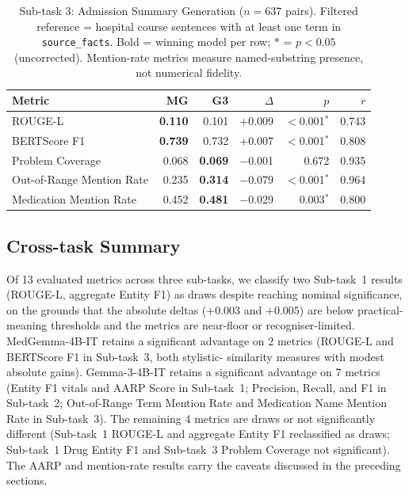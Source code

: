 \documentclass[sigconf,anonymous=false,review=false]{acmart}
\newcommand{\medgemma}{MedGemma-4B-IT\xspace}
\newcommand{\gemma}{Gemma-3-4B-IT\xspace}
\begin{document}
\begin{table}[t]
\caption{Sub-task 3: Admission Summary Generation ($n = 637$ pairs). Filtered
reference = hospital course sentences with at least one term in
\texttt{source\_facts}. Bold = winning model per row; $*$ = $p < 0.05$
(uncorrected). Mention-rate metrics measure named-substring presence, not
numerical fidelity.}
\label{tab:summary}
\small
\begin{tabular}{@{}lrrrrr@{}}
\toprule
\textbf{Metric} & \textbf{MG} & \textbf{G3} & \textbf{$\Delta$} &
  \textbf{$p$} & \textbf{$r$} \\
\midrule
ROUGE-L                       & \textbf{0.110} & 0.101 & $+$0.009 & $<$0.001$^*$ & 0.743 \\
BERTScore F1                  & \textbf{0.739} & 0.732 & $+$0.007 & $<$0.001$^*$ & 0.808 \\
Problem Coverage              & 0.068 & \textbf{0.069} & $-$0.001 & 0.672 & 0.935 \\
Out-of-Range Mention Rate     & 0.235 & \textbf{0.314} & $-$0.079 & $<$0.001$^*$ & 0.964 \\
Medication Mention Rate       & 0.452 & \textbf{0.481} & $-$0.029 & 0.003$^*$ & 0.800 \\
\bottomrule
\end{tabular}
\end{table}

\subsection{Cross-task Summary}

Of 13 evaluated metrics across three sub-tasks, we classify two Sub-task~1
results (ROUGE-L, aggregate Entity F1) as draws despite reaching nominal
significance, on the grounds that the absolute deltas (\(+0.003\) and
\(+0.005\)) are below practical-meaning thresholds and the metrics are
near-floor or recogniser-limited. \medgemma retains a significant advantage
on 2 metrics (ROUGE-L and BERTScore F1 in Sub-task~3, both stylistic-
similarity measures with modest absolute gains). \gemma retains a significant
advantage on 7 metrics (Entity F1 vitals and AARP Score in Sub-task~1;
Precision, Recall, and F1 in Sub-task~2; Out-of-Range Term Mention Rate and
Medication Name Mention Rate in Sub-task~3). The remaining 4 metrics are
draws or not significantly different (Sub-task~1 ROUGE-L and aggregate
Entity F1 reclassified as draws; Sub-task~1 Drug Entity F1 and Sub-task~3
Problem Coverage not significant). The AARP and mention-rate results carry
the caveats discussed in the preceding sections.
\end{document}
